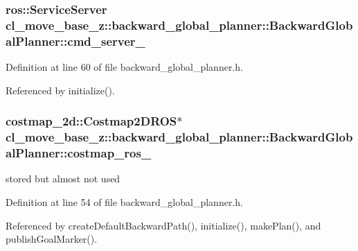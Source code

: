 \subsubsection[{\texorpdfstring{cmd\+\_\+server\+\_\+}{cmd_server_}}]{\setlength{\rightskip}{0pt plus 5cm}ros\+::\+Service\+Server cl\+\_\+move\+\_\+base\+\_\+z\+::backward\+\_\+global\+\_\+planner\+::\+Backward\+Global\+Planner\+::cmd\+\_\+server\+\_\+\hspace{0.3cm}{\ttfamily [private]}}\hypertarget{classcl__move__base__z_1_1backward__global__planner_1_1BackwardGlobalPlanner_a77a63b85852ee58b5a142e1361bf984e}{}\label{classcl__move__base__z_1_1backward__global__planner_1_1BackwardGlobalPlanner_a77a63b85852ee58b5a142e1361bf984e}


Definition at line 60 of file backward\+\_\+global\+\_\+planner.\+h.



Referenced by initialize().

\subsubsection[{\texorpdfstring{costmap\+\_\+ros\+\_\+}{costmap_ros_}}]{\setlength{\rightskip}{0pt plus 5cm}costmap\+\_\+2d\+::\+Costmap2\+D\+R\+OS$\ast$ cl\+\_\+move\+\_\+base\+\_\+z\+::backward\+\_\+global\+\_\+planner\+::\+Backward\+Global\+Planner\+::costmap\+\_\+ros\+\_\+\hspace{0.3cm}{\ttfamily [private]}}\hypertarget{classcl__move__base__z_1_1backward__global__planner_1_1BackwardGlobalPlanner_a7103c15e6540a514acd421c3c6e194a4}{}\label{classcl__move__base__z_1_1backward__global__planner_1_1BackwardGlobalPlanner_a7103c15e6540a514acd421c3c6e194a4}


stored but almost not used 



Definition at line 54 of file backward\+\_\+global\+\_\+planner.\+h.



Referenced by create\+Default\+Backward\+Path(), initialize(), make\+Plan(), and publish\+Goal\+Marker().

